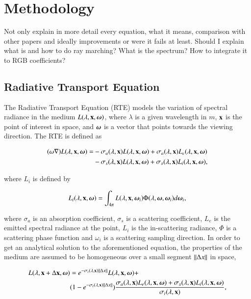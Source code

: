\chapter{Methodology}
\label{ch:methodology}

Not only explain in more detail every equation, what it means, comparison with other papers and ideally improvements or were it fails at least.
Should I explain what is and how to do ray marching? What is the spectrum? How to integrate it to RGB coefficients?

\section{Radiative Transport Equation}
\label{sec:radiative_transport_equation}

The Radiative Transport Equation (RTE) models the variation of spectral radiance in the medium $L(\lambda, \mathbf{x}, \boldsymbol{\omega})$, where $\lambda$ is a given wavelength in $m$, $\mathbf{x}$ is the point of interest in space, and $\boldsymbol{\omega}$ is a vector that points towards the viewing direction.
The RTE is defined as

\begin{equation}
\begin{split}
(\omega \nabla) L(\lambda, \mathbf{x}, \boldsymbol{\omega}) = &- \sigma_a(\lambda, \mathbf{x}) L(\lambda, \mathbf{x}, \boldsymbol{\omega}) + \sigma_a(\lambda, \mathbf{x}) L_e(\lambda, \mathbf{x}, \boldsymbol{\omega}) \\
&- \sigma_s(\lambda, \mathbf{x}) L(\lambda, \mathbf{x}, \boldsymbol{\omega}) + \sigma_s(\lambda, \mathbf{x}) L_i(\lambda, \mathbf{x}, \boldsymbol{\omega}),
\end{split}
\end{equation}

where $L_i$ is defined by

\begin{equation}
L_i(\lambda, \mathbf{x}, \boldsymbol{\omega}) = \int_{4 \pi} L(\lambda, \mathbf{x}, \boldsymbol{\omega}_i) \Phi (\lambda, \boldsymbol{\omega}, \boldsymbol{\omega}_i) d \boldsymbol{\omega}_i,
\end{equation}

where $\sigma_a$ is an absorption coefficient, $\sigma_s$ is a scattering coefficient, $L_e$ is the emitted spectral radiance at the point, $L_i$ is the in-scattering radiance, $\Phi$ is a scattering phase function and $\omega_i$ is a scattering sampling direction.
In order to get an analytical solution to the aforementioned equation, the properties of the medium are assumed to be homogeneous over a small segment $\left \| \Delta x \right \|$ in space,

\begin{equation}
\begin{split}
L(\lambda, \mathbf{x} + \Delta\mathbf{x}, \boldsymbol{\omega}) &= e^{-\sigma_t(\lambda, \mathbf{x}) \left \| \Delta x \right \|} L(\lambda, \mathbf{x}, \boldsymbol{\omega}) +  \\
& (1 - e^{-\sigma_t(\lambda, \mathbf{x}) \left \| \Delta x \right \|} ) \frac{\sigma_a(\lambda, \mathbf{x}) L_e(\lambda, \mathbf{x}, \boldsymbol{\omega}) + \sigma_s(\lambda, \mathbf{x}) L_i(\lambda, \mathbf{x}, \boldsymbol{\omega})}{\sigma_t(\lambda, \mathbf{x})},
\end{split}
\end{equation}

